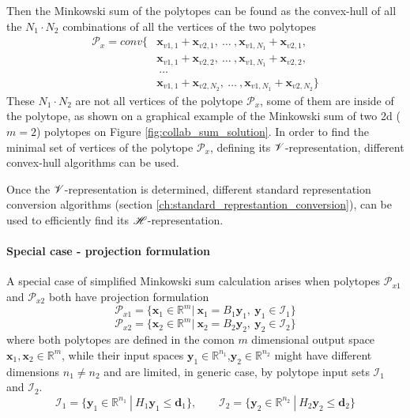Then the Minkowski sum of the polytopes can be found as the convex-hull of all the $N_1\!\cdot\!N_2$ combinations of all the vertices of the two polytopes
\begin{equation}
\begin{split}
    \mathcal{P}_x =  conv\big\{&\bm{x}_{v1,1} + \bm{x}_{v2,1},~ \ldots~,\bm{x}_{v1, N_1} + \bm{x}_{v2,1},\\&\bm{x}_{v1,1} + \bm{x}_{v2,2},~\ldots~,\bm{x}_{v1, N_1} + \bm{x}_{v2,2},\\&~\ldots~\\
    &\bm{x}_{v1, 1}  +\bm{x}_{v2,N_2}, ~\ldots~ ,\bm{x}_{v1, N_1} +\bm{x}_{v2,N_2}\big\}
\end{split}
\end{equation}
These $N_1\!\cdot\!N_2$ are not all vertices of the polytope $\mathcal{P}_x$, some of them are inside of the polytope, as shown on a graphical example of the Minkowski sum of two  2d ($m=2$) polytopes on Figure \ref{fig:collab_sum_solution}. In order to find the minimal set of vertices of the polytope $\mathcal
{P}_x$, defining its $\mathscr{V}$-representation, different convex-hull algorithms \cite{Barber1996} can be used.

Once the $\mathscr{V}$-representation is determined, different standard representation conversion algorithms (section \ref{ch:standard_represtantion_conversion}), can be used to efficiently find its $\mathscr{H}$-representation.


\paragraph*{Special case - projection formulation}
A special case of simplified Minkowski sum calculation arises when polytopes $\mathcal{P}_{x1}$ and $\mathcal{P}_{x2}$ both have projection formulation
\begin{equation}
    \mathcal{P}_{x1}=\{\bm{x}_1\in\mathbb{R}^m |~ \bm{x}_1 = B_1\bm{y}_1,~\bm{y}_1 \in \mathcal{I}_1  \}
\end{equation}
\begin{equation}
    \mathcal{P}_{x2}=\{\bm{x}_2\in\mathbb{R}^m |~ \bm{x}_2 = B_2\bm{y}_2,~\bm{y}_2 \in \mathcal{I}_2  \}
\end{equation}
where both polytopes are defined in the comon $m$ dimensional output space $\bm{x}_1,\bm{x}_2\in\mathbb{R}^m$, while their input spaces $\bm{y}_1\in\mathbb{R}^{n_1}$,$\bm{y}_2\in\mathbb{R}^{n_2}$ might have different dimensions $n_1\neq n_2$ and are limited, in generic case, by polytope input sets $\mathcal{I}_1$ and $\mathcal{I}_2$.
\begin{equation}
    \mathcal{I}_{1}=\{\bm{y}_1\in\mathbb{R}^{n_1} ~|~ H_1\bm{y}_1 \leq \bm{d}_1\}, \qquad
    \mathcal{I}_{2}=\{\bm{y}_2\in\mathbb{R}^{n_2} ~|~ H_2\bm{y}_2 \leq \bm{d}_2\}
\end{equation}

